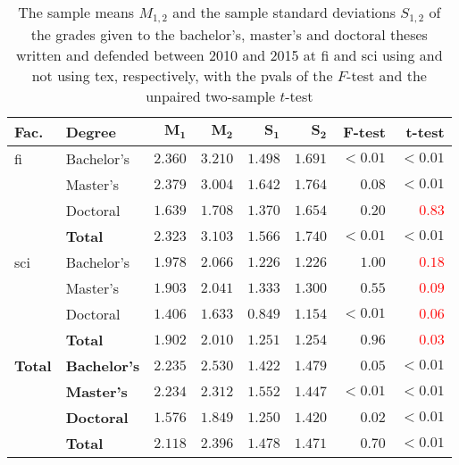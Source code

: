 \begin{table}
  \caption{The sample means $M_{1,2}$ and the sample standard deviations $S_{1,2}$ of the grades given to the bachelor's, master's and doctoral theses written and defended between 2010 and 2015 at \acrshort{fi} and \acrshort{sci} using and not using \gls{tex}, respectively, with the \glspl{pval} of the $F$-test and the unpaired two-sample $t$-test}
  \begin{tabularx}{\textwidth}{Xlrrrrrr}
      \bf Fac. & \bf Degree & $\mathbf{M_1}$ & $\mathbf{M_2}$ & $\mathbf{S_1}$ & $\mathbf{S_2}$ & \bf F-test & \bf t-test \\
    \hline
    \acrshort{fi}  %
      & Bachelor's & $2.360$ & $3.210$ & $1.498$ & $1.691$ & $<0.01$ & \textcolor{OliveGreen}{$<0.01$} \\
      & Master's   & $2.379$ & $3.004$ & $1.642$ & $1.764$ & $0.08$ & \textcolor{OliveGreen}{$<0.01$} \\
      & Doctoral   & $1.639$ & $1.708$ & $1.370$ & $1.654$ & $0.20$ & \textcolor{red}{$0.83$} \\
      & \textbf{Total}      & $\mathbf{2.323}$ & $\mathbf{3.103}$ \bf & $\mathbf{1.566}$ & $\mathbf{1.740}$ & $\mathbf{<0.01}$ & \textcolor{OliveGreen}{$\mathbf{<0.01}$}\\

    \acrshort{sci} %
      & Bachelor's & $1.978$ & $2.066$ & $1.226$ & $1.226$ & $1.00$ & \textcolor{red}{$0.18$} \\
      & Master's   & $1.903$ & $2.041$ & $1.333$ & $1.300$ & $0.55$ & \textcolor{red}{$0.09$} \\
      & Doctoral   & $1.406$ & $1.633$ & $0.849$ & $1.154$ & $<0.01$ & \textcolor{red}{$0.06$} \\

      & \textbf{Total}      & $\mathbf{1.902}$ & $\mathbf{2.010}$ & $\mathbf{1.251}$ & $\mathbf{1.254}$ & $\mathbf{0.96}$ & \textcolor{red}{$\mathbf{0.03}$} \\
    \hline
    \textbf{Total} 
    & \textbf{Bachelor's} & $\mathbf{2.235}$ & $\mathbf{2.530}$ & $\mathbf{1.422}$ & $\mathbf{1.479}$ & $\mathbf{0.05}$  & \textcolor{OliveGreen}{$\mathbf{<0.01}$} \\
    & \textbf{Master's} & $\mathbf{2.234}$ & $\mathbf{2.312}$ & $\mathbf{1.552}$ & $\mathbf{1.447}$ & $\mathbf{<0.01}$ & \textcolor{OliveGreen}{$\mathbf{<0.01}$} \\
    & \textbf{Doctoral} & $\mathbf{1.576}$ & $\mathbf{1.849}$ & $\mathbf{1.250}$ & $\mathbf{1.420}$ & $\mathbf{0.02}$ & \textcolor{OliveGreen}{$\mathbf{<0.01}$} \\
    & \textbf{Total}    & $\mathbf{2.118}$ & $\mathbf{2.396}$ & $\mathbf{1.478}$ & $\mathbf{1.471}$ & $\mathbf{0.70}$ & \textcolor{OliveGreen}{$\mathbf{<0.01}$} \\
  \end{tabularx}
  \label{table:statistics-tex-grades}
\end{table}

